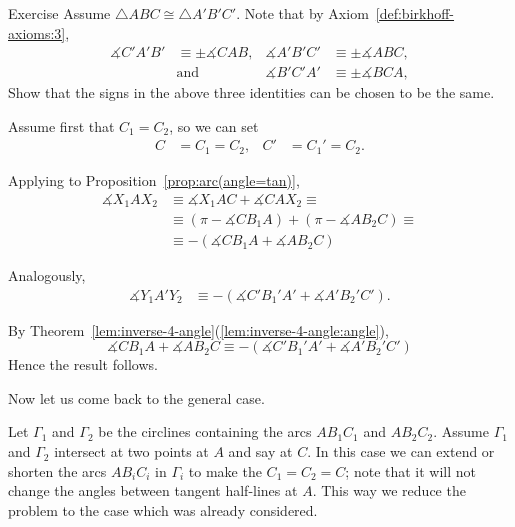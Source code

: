 \begin{thm}{Exercise}\label{ex:angle-signs-in-trig}
Assume $\triangle ABC\cong\triangle A'B'C'$. 
Note that by Axiom~\ref{def:birkhoff-axioms:3},
\begin{align*}
\measuredangle C'A'B'&\equiv\pm\measuredangle CAB,
&
\measuredangle A'B'C'&\equiv\pm\measuredangle ABC,
\\
&\text{and}&\measuredangle B'C'A'&\equiv\pm\measuredangle BCA,
\end{align*}
Show that the signs in the above three identities can be chosen
to be the same. 
\end{thm}









Assume first that $C_1=C_2$, so we can set 
\begin{align*}
C&=C_1=C_2,
&
C'&=C_1'=C_2.
\end{align*}


Applying to Proposition~\ref{prop:arc(angle=tan)},
\begin{align*}
\measuredangle X_1AX_2&\equiv\measuredangle X_1AC+\measuredangle CAX_2\equiv
\\
&\equiv(\pi-\measuredangle CB_1A)+(\pi-\measuredangle AB_2 C)\equiv
\\
&
\equiv -(\measuredangle CB_1A+\measuredangle AB_2 C)
\end{align*}

Analogously,
\begin{align*}
\measuredangle Y_1A'Y_2&
\equiv -(\measuredangle C'B_1'A'+\measuredangle A'B_2' C').
\end{align*}

By Theorem~\ref{lem:inverse-4-angle}(\ref{lem:inverse-4-angle:angle}), 
\[\measuredangle CB_1A+\measuredangle AB_2 C
\equiv
-(\measuredangle C'B_1'A'+\measuredangle A'B_2' C')
\]
Hence the result follows.

Now let us come back to the general case.

Let $\Gamma_1$ and $\Gamma_2$ be the circlines containing the arcs $AB_1C_1$ and $AB_2C_2$.
Assume $\Gamma_1$ and $\Gamma_2$ intersect at two points at $A$ and say at $C$.
In this case we can extend or shorten the arcs  $AB_iC_i$ in $\Gamma_i$ to make the $C_1=C_2=C$;
note that it will not change the angles between tangent half-lines at $A$.
This way we reduce the problem to the case which was already considered.

